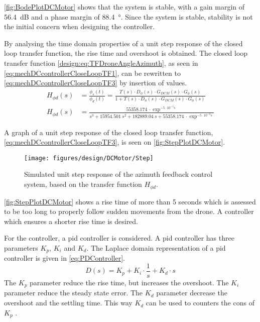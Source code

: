 \autoref{fig:BodePlotDCMotor} shows that the system is stable, with a gain margin of \SI{56.4}{\deci\bel} and a phase margin of \SI{88.4}{\degree}. Since the system is stable, stability is not the initial concern when designing the controller. 

By analysing the time domain properties of a unit step response of the closed loop transfer function, the rise time and overshoot is obtained. The closed loop transfer function \autoref{design:eq:TFDroneAngleAzimuth}, as seen in \autoref{eq:mechDCcontrollerCloseLoopTF1}, can be rewritten to \autoref{eq:mechDCcontrollerCloseLoopTF3} by insertion of values. 
\begin{subequations}
\begin{align} 
H_{\phi d}(s)&=\frac{\phi_s (t)}{\phi_d (t)}=\frac{T(s) \cdot D_\phi (s) \cdot G_{DCM}(s) \cdot G_\phi (s)}{1+T(s) \cdot D_\phi (s) \cdot G_{DCM}(s) \cdot G_\phi (s)} \label{eq:mechDCcontrollerCloseLoopTF1} \\
H_{\phi d}(s) &= \frac{\SI{55358.174}{} \cdot \exp^{-5\cdot 10^{-5} s}}{s^3 + \SI{15954.501}{} s^2 + \SI{182889.04}{} s + \SI{55358.174}{}\cdot \exp^{-5 \cdot 10^{-3} s}} \label{eq:mechDCcontrollerCloseLoopTF3} 
\end{align}
\end{subequations}

A graph of a unit step response of the closed loop transfer function, \autoref{eq:mechDCcontrollerCloseLoopTF3}, is seen on \autoref{fig:StepPlotDCMotor}. 
\begin{figure}[h!]
	\centering
	\texttt{[image: figures/design/DCMotor/Step]}
	\caption{Simulated unit step response of the azimuth feedback control system, based on the transfer function $H_{\phi d}$.}
	\label{fig:StepPlotDCMotor}
\end{figure}

\autoref{fig:StepPlotDCMotor} shows a rise time of more than 5 seconds which is assessed to be too long to properly follow sudden movements from the drone. A controller which ensures a shorter rise time is desired.  

\newpage
For the controller, a \gls{pid} controller is considered. A \gls{pid} controller has three parameters $K_p$, $K_i$ and $K_d$. The Laplace domain representation of a \gls{pid} controller is given in \autoref{eq:PDController}.
\begin{equation}\label{eq:PDController}
	D(s) = K_p + K_i \cdot \frac{1}{s} + K_d\cdot s 
\end{equation}
\startexplain
{}
\stopexplain
The $K_p$ parameter reduce the rise time, but increases the overshoot. The $K_i$ parameter reduce the steady state error. The $K_d$ parameter decrease the overshoot and the settling time. This way $K_d$ can be used to counters the cons of $K_p$ \citep{web:CTMS}.

